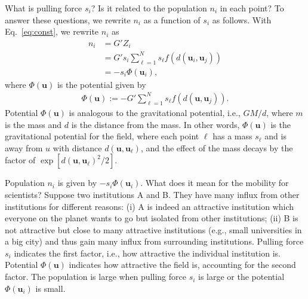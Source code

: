 \documentclass[12pt]{article} %
\def\vec#1{{\bm #1}}
\begin{document}
What is pulling force $s_i$? Is it related to the population $n_i$ in each point?
To answer these questions, we rewrite $n_i$ as a function of $s_i$ as follows. 
With Eq.~\eqref{eq:const}, we rewrite $n_i$ as 
\begin{align}
    n_i &= G' Z_i \nonumber \\
        &= G' s_i \sum_{\ell=1}^N s_\ell f\left(d\left(\vec{u}_i,\vec{u}_j\right)\right) \nonumber \\ 
        &= - s_i \Phi(\vec{u}_i), \label{eq:flow_gravity_model_2} %
\end{align}
where $\Phi(\vec{u})$ is the potential given by 
\begin{align}
    \Phi(\vec{u}):=-G' \sum_{\ell=1}^N s_\ell f\left(d\left(\vec{u},\vec{u}_j\right)\right).
\end{align}
Potential $\Phi(\vec{u})$ is analogous to the gravitational potential, i.e., $GM/d$, where $m$ is the mass and $d$ is the distance from the mass.
In other words,  $\Phi(\vec{u})$ is the gravitational potential for the field, where 
each point $\ell$ has a mass $s_{\ell}$ and is away from $u$ with distance $d(\vec{u},\vec{u}_\ell)$, and the effect of the mass decays by the factor of $\exp\left[d(\vec{u},\vec{u}_\ell) ^2 /2\right]$.

Population $n_i$ is given by $-s_i\Phi(\vec{u}_i)$. What does it mean for the mobility for scientists?
Suppose two institutions A and B. They have many influx from other institutions for different reasons:
(i) A is indeed an attractive institution which everyone on the planet wants to go but isolated from other institutions;
(ii) B is not attractive but close to many attractive institutions (e.g., small universities in a big city) and thus gain many influx from surrounding institutions.
Pulling force $s_i$ indicates the first factor, i.e., how attractive the individual institution is. 
Potential $\Phi(\vec{u})$ indicates how attractive the field is, accounting for the second factor.
The population is large when pulling force $s_i$ is large or the potential $\Phi(\vec{u}_i)$ is small. 
\end{document}
